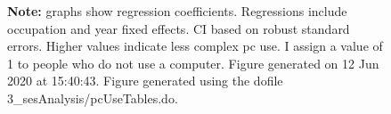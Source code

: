 \begin{figure}[!h]
\par \begin{minipage}[h]{\textwidth}{\scriptsize\textbf{Note:} graphs show regression coefficients. Regressions include occupation and year fixed effects. CI based on robust standard errors. Higher values indicate less complex pc use. I assign a value of 1 to people who do not use a computer. Figure generated on 12 Jun 2020 at 15:40:43. Figure generated using the dofile 3\_sesAnalysis/pcUseTables.do.}\end{minipage}
\end{figure}

